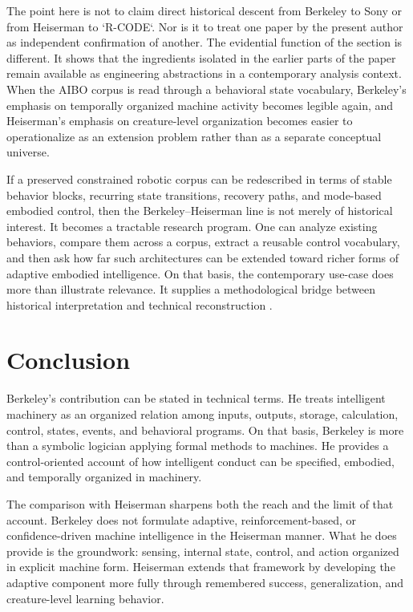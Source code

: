 \documentclass[11pt]{article}
\begin{document}
The point here is not to claim direct historical descent from Berkeley to Sony or from Heiserman to `R-CODE`. Nor is it to treat one paper by the present author as independent confirmation of another. The evidential function of the section is different. It shows that the ingredients isolated in the earlier parts of the paper remain available as engineering abstractions in a contemporary analysis context. When the AIBO corpus is read through a behavioral state vocabulary, Berkeley's emphasis on temporally organized machine activity becomes legible again, and Heiserman's emphasis on creature-level organization becomes easier to operationalize as an extension problem rather than as a separate conceptual universe.

If a preserved constrained robotic corpus can be redescribed in terms of stable behavior blocks, recurring state transitions, recovery paths, and mode-based embodied control, then the Berkeley--Heiserman line is not merely of historical interest. It becomes a tractable research program. One can analyze existing behaviors, compare them across a corpus, extract a reusable control vocabulary, and then ask how far such architectures can be extended toward richer forms of adaptive embodied intelligence. On that basis, the contemporary use-case does more than illustrate relevance. It supplies a methodological bridge between historical interpretation and technical reconstruction \citep{tucker2026behavioral}.

\section{Conclusion}

Berkeley's contribution can be stated in technical terms. He treats intelligent machinery as an
organized relation among inputs, outputs, storage, calculation, control, states, events, and
behavioral programs. On that basis, Berkeley is more than a symbolic logician applying formal
methods to machines. He provides a control-oriented account of how intelligent conduct can be
specified, embodied, and temporally organized in machinery.

The comparison with Heiserman sharpens both the reach and the limit of that account. Berkeley
does not formulate adaptive, reinforcement-based, or confidence-driven machine intelligence in the
Heiserman manner. What he does provide is the groundwork: sensing, internal state, control, and
action organized in explicit machine form. Heiserman extends that framework by developing the
adaptive component more fully through remembered success, generalization, and creature-level
learning behavior.
\end{document}
